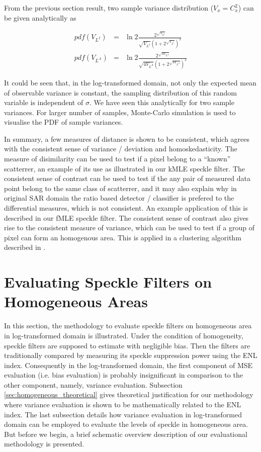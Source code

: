 \documentclass[journal]{IEEEtran}
\begin{document}
From the previous section result, two sample variance distribution ($V_x = C_x^2$) can be given analytically as

\begin{eqnarray}
pdf(V_{L^I}) &=& 
	\ln2 \frac{ 2^{\sqrt{V_{L^I}}}}{\sqrt{V_{L^I}} \left( 1+2^{\sqrt{V_{L^I}}} \right)^2} \\
pdf(V_{L^A}) &=&
	\ln2 \frac{2^{\sqrt{4V_{L^A}}}}{\sqrt{4V_{L^A}} \left( 1+2^{\sqrt{4V_{L^A}}} \right)^2} 
\end{eqnarray}

It could be seen that, in the log-transformed domain, not only the expected mean of observable variance is constant, the sampling distribution of this random variable is independent of $\sigma$. 
We have seen this analytically for two sample variances. 
For larger number of samples, Monte-Carlo simulation is used to visualise the PDF of sample variances. 

In summary, a few measures of distance is shown to be consistent, which agrees with the consistent sense of variance / deviation and homoskedasticity.
The measure of disimilarity can be used to test if a pixel belong to a ``known'' scatterrer, an example of its use as illustrated in our kMLE speckle filter.
The consistent sense of contrast can be used to test if the any pair of measured data point belong to the same class of scatterrer, 
	and it may also explain why in original SAR domain the ratio based detector / classifier is prefered to the differential measures, which is not consistent. 
An example application of this is described in our fMLE speckle filter.
The consistent sense of contrast also gives rise to the consistent measure of variance, which can be used to test if a group of pixel can form an homogenous area.
This is applied in a clustering algorithm described in \cite{Le_2010_ACRS}.

\section{Evaluating Speckle Filters on Homogeneous Areas}
\label{sec:eval_homo}

In this section, the methodology to evaluate speckle filters on homogeneous area in log-transformed domain is illustrated.
Under the condition of homogeneity, speckle filters are supposed to estimate with negligible bias.
Then the filters are traditionally compared by measuring its speckle suppression power using the ENL index.
Consequently in the log-transformed domain, the first component of MSE evaluation (i.e. bias evaluation) is probably insignificant in comparison to the other component, namely, variance evaluation. 
Subsection \ref{sec:homogeneous_theoretical} gives theoretical justification for our methodology where variance evaluation is shown to be mathematically related to the ENL index.
The last subsection details how variance evaluation in log-transformed domain can be employed to evaluate the levels of speckle in homogeneous area.
But before we begin, a brief schematic overview description of our evaluational methodology is presented.
\end{document}
